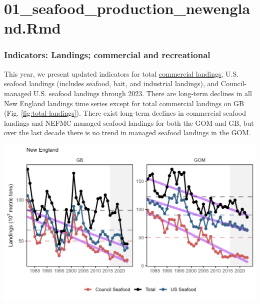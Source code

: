 \documentclass[
  10pt,
]{article}
\let\origfigure\figure
\let\endorigfigure\endfigure
\renewenvironment{figure}[1][2] {
    \expandafter\origfigure\expandafter[H]
} {
    \endorigfigure
}
\begin{document}
\section{01\_seafood\_production\_newengland.Rmd}\label{seafood_production_newengland.rmd}

\subsubsection{Indicators: Landings; commercial and recreational}\label{indicators-landings-commercial-and-recreational-1}

This year, we present updated indicators for total \href{https://noaa-edab.github.io/catalog/comdat.html}{commercial landings}, U.S. seafood landings (includes seafood, bait, and industrial landings), and Council-managed U.S. seafood landings through 2023. There are long-term declines in all New England landings time series except for total commercial landings on GB (Fig. \ref{fig:total-landings}). There exist long-term declines in commercial seafood landings and NEFMC managed seafood landings for both the GOM and GB, but over the last decade there is no trend in managed seafood landings in the GOM.

\begin{figure}

{\centering \includegraphics[width=6.5in]{images/NewEngland/total_landings_NewEngland_2025-09-09} 

}

\caption{Total commercial landings (black), total U.S. seafood landings (blue), and New England managed U.S. seafood landings (red) for Georges Bank (GB) and the Gulf of Maine (GOM).}\label{fig:total-landings-46}
\end{figure}
\end{document}
